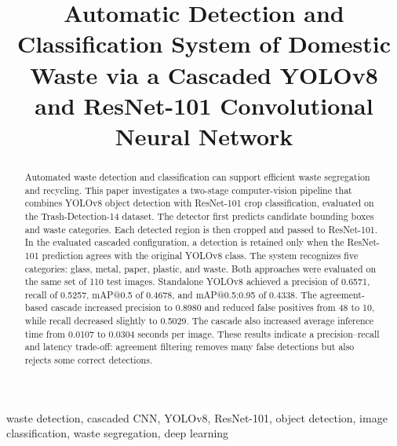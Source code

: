 \documentclass[conference]{IEEEtran}
\begin{document}
\title{Automatic Detection and Classification System of Domestic Waste via a Cascaded YOLOv8 and ResNet-101 Convolutional Neural Network}

\author{
\and
{}
}

\maketitle

\begin{abstract}
Automated waste detection and classification can support efficient waste segregation and recycling. This paper investigates a two-stage computer-vision pipeline that combines YOLOv8 object detection with ResNet-101 crop classification, evaluated on the Trash-Detection-14 dataset. The detector first predicts candidate bounding boxes and waste categories. Each detected region is then cropped and passed to ResNet-101. In the evaluated cascaded configuration, a detection is retained only when the ResNet-101 prediction agrees with the original YOLOv8 class. The system recognizes five categories: glass, metal, paper, plastic, and waste. Both approaches were evaluated on the same set of 110 test images. Standalone YOLOv8 achieved a precision of 0.6571, recall of 0.5257, mAP@0.5 of 0.4678, and mAP@0.5:0.95 of 0.4338. The agreement-based cascade increased precision to 0.8980 and reduced false positives from 48 to 10, while recall decreased slightly to 0.5029. The cascade also increased average inference time from 0.0107 to 0.0304 seconds per image. These results indicate a precision--recall and latency trade-off: agreement filtering removes many false detections but also rejects some correct detections.
\end{abstract}

\begin{IEEEkeywords}
waste detection, cascaded CNN, YOLOv8, ResNet-101, object detection, image classification, waste segregation, deep learning
\end{IEEEkeywords}
\end{document}
